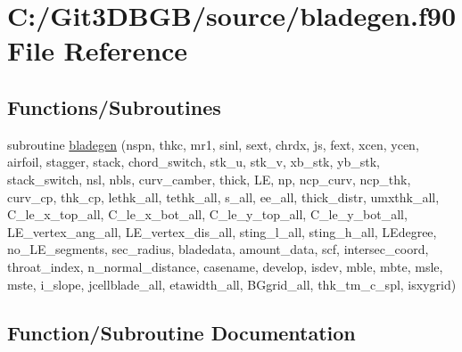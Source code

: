 \hypertarget{bladegen_8f90}{}\section{C\+:/\+Git3\+D\+B\+G\+B/source/bladegen.f90 File Reference}
\label{bladegen_8f90}
\subsection*{Functions/\+Subroutines}
\begin{DoxyCompactItemize}
\item 
subroutine \hyperlink{bladegen_8f90_abe1d53034e73a0fd4caf61124de7e6eb}{bladegen} (nspn, thkc, mr1, sinl, sext, chrdx, js, fext, xcen, ycen, airfoil,                                                                           stagger, stack, chord\+\_\+switch, stk\+\_\+u, stk\+\_\+v, xb\+\_\+stk, yb\+\_\+stk, stack\+\_\+switch,                                                                           nsl, nbls, curv\+\_\+camber, thick, L\+E, np, ncp\+\_\+curv, ncp\+\_\+thk, curv\+\_\+cp, thk\+\_\+cp,                                                                           lethk\+\_\+all, tethk\+\_\+all, s\+\_\+all, ee\+\_\+all, thick\+\_\+distr, umxthk\+\_\+all,                                                       C\+\_\+le\+\_\+x\+\_\+top\+\_\+all, C\+\_\+le\+\_\+x\+\_\+bot\+\_\+all, C\+\_\+le\+\_\+y\+\_\+top\+\_\+all, C\+\_\+le\+\_\+y\+\_\+bot\+\_\+all,                                                       L\+E\+\_\+vertex\+\_\+ang\+\_\+all, L\+E\+\_\+vertex\+\_\+dis\+\_\+all, sting\+\_\+l\+\_\+all, sting\+\_\+h\+\_\+all, L\+Edegree, no\+\_\+\+L\+E\+\_\+segments,                                                       sec\+\_\+radius, bladedata, amount\+\_\+data, scf, intersec\+\_\+coord, throat\+\_\+index,                                                                           n\+\_\+normal\+\_\+distance, casename, develop, isdev, mble, mbte, msle, mste, i\+\_\+slope, jcellblade\+\_\+all,                                                                           etawidth\+\_\+all, B\+Ggrid\+\_\+all, thk\+\_\+tm\+\_\+c\+\_\+spl, isxygrid)
\end{DoxyCompactItemize}


\subsection{Function/\+Subroutine Documentation}
\hypertarget{bladegen_8f90_abe1d53034e73a0fd4caf61124de7e6eb}{}
